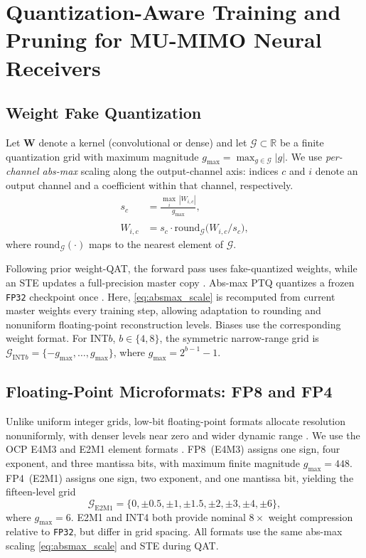 \section{Quantization-Aware Training and Pruning for MU-MIMO Neural Receivers}
\label{sec:nrx_qat}

\subsection{Weight Fake Quantization}
\label{sec:fake_quant}
Let $\mathbf{W}$ denote a kernel (convolutional or dense) and let
$\mathcal{G}\subset\mathbb{R}$ be a finite quantization grid with
maximum magnitude $g_{\max}=\max_{g\in\mathcal{G}}|g|$. We use
\emph{per-channel abs-max} scaling along the output-channel axis:
indices $c$ and $i$ denote an output channel and a coefficient within
that channel, respectively.
\begin{align}
  s_c &= \frac{\max_{i}\,|W_{i,c}|}{g_{\max}},
  \label{eq:absmax_scale}\\
  \widehat{W}_{i,c}
  &=s_c\cdot\mathrm{round}_{\mathcal{G}}\!\bigl(W_{i,c}/s_c\bigr),
  \label{eq:fake_quant}
\end{align}
where $\mathrm{round}_{\mathcal{G}}(\cdot)$ maps to the nearest
element of $\mathcal{G}$. %

Following prior weight-\gls{QAT}, the forward pass uses fake-quantized
weights, while an \gls{STE} updates a full-precision master copy
\cite{understanding_STE}.
Abs-max \gls{PTQ} quantizes a frozen \texttt{FP32} checkpoint once
\cite{saketh_asilomar25}. Here, \eqref{eq:absmax_scale} is recomputed
from current master weights every training step, allowing adaptation
to rounding and nonuniform floating-point reconstruction levels.
Biases use the corresponding weight format. For INT$b$,
$b\in\{4,8\}$, the symmetric narrow-range grid is
$\mathcal{G}_{\mathrm{INT}b}=\{-g_{\max},\ldots,g_{\max}\}$, where
$g_{\max}=2^{b-1}-1$.

\vspace{-2mm}

\subsection{Floating-Point Microformats: FP8 and FP4}
\label{sec:fp_micro}
Unlike uniform integer grids, low-bit floating-point formats allocate
resolution nonuniformly, with denser levels near zero and wider dynamic
range \cite{micikevicius2022fp8,rouhani2023microscaling}. We use the
OCP E4M3 and E2M1 element formats \cite{ocp2023mx}. FP8~(E4M3) assigns
one sign, four exponent, and three mantissa bits, with maximum finite
magnitude $g_{\max}=448$. FP4~(E2M1) assigns one sign, two exponent,
and one mantissa bit, yielding the fifteen-level grid
\begin{equation}
\label{eq:fp4_grid}
  \mathcal{G}_{\mathrm{E2M1}}
  = \{0,\pm0.5,\pm1,\pm1.5,\pm2,\pm3,\pm4,\pm6\},
\end{equation}
where $g_{\max}=6$. E2M1 and INT4 both provide nominal $8\times$
weight compression relative to \texttt{FP32}, but differ in grid
spacing. All formats use the same abs-max scaling
\eqref{eq:absmax_scale} and \gls{STE} during \gls{QAT}.

